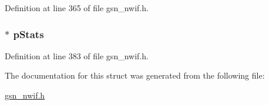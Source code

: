 Definition at line 365 of file gsn\_\-nwif.h.

\hypertarget{a00169_aec0dbb062c1551edeb82d3a45c451e01}{
\subsubsection[{pStats}]{$\ast$ {\bf pStats}}}
\label{a00169_aec0dbb062c1551edeb82d3a45c451e01}


Definition at line 383 of file gsn\_\-nwif.h.



The documentation for this struct was generated from the following file:\begin{DoxyCompactItemize}
\item 
\hyperlink{a00534}{gsn\_\-nwif.h}\end{DoxyCompactItemize}
